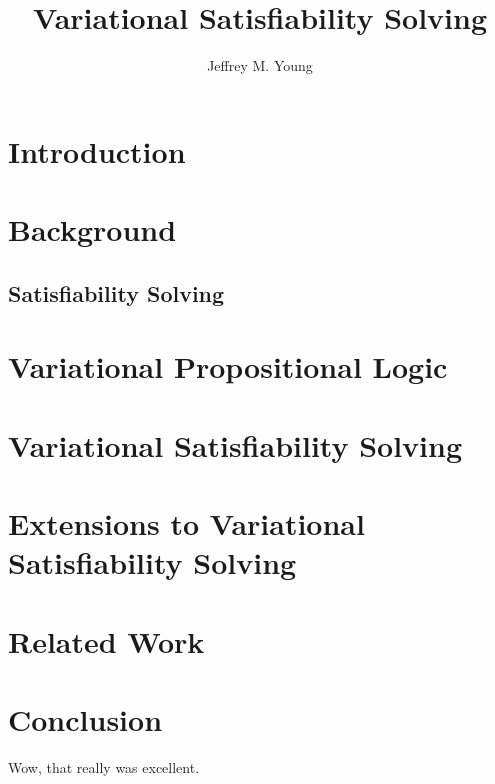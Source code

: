 \documentclass[onehalf,11pt]{beavtex}
\title{Variational Satisfiability Solving}
\author{Jeffrey M. Young}
\begin{document}
\maketitle

\mainmatter{}

\listoftodos{}

\chapter{Introduction}



\chapter{Background}

\section{Satisfiability Solving}

\chapter{Variational Propositional Logic}

\chapter{Variational Satisfiability Solving}

\chapter{Extensions to Variational Satisfiability Solving}

\chapter{Related Work}


\chapter{Conclusion}
Wow, that really was excellent.
\end{document}
